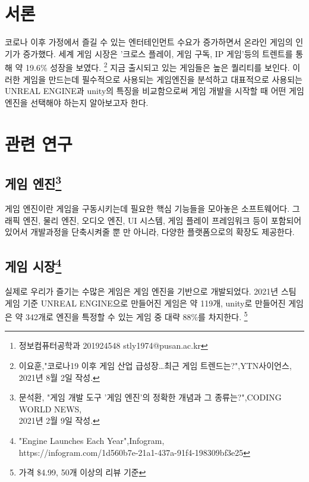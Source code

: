 \documentclass{article}
\title{}
\author{이풍헌\footnote{정보컴퓨터공학과 201924548 stly1974@pusan.ac.kr}}
\date{2022.10.07}
\begin{document}
\maketitle

\section{서론}
코로나 이후 가정에서 즐길 수 있는 엔터테인먼트 수요가 증가하면서 온라인 게임의 인기가 증가했다. 세계 게임 시장은 '크로스 플레이, 게임 구독, IP 게임'등의 트렌트를 통해 약 19.6\% 성장을 보였다.
\footnote{이요훈,"코로나19 이후 게임 산업 급성장…최근 게임 트렌드는?",YTN사이언스,\\2021년 8월 2일 작성.}
지금 출시되고 있는 게임들은 높은 퀄리티를 보인다. 이러한 게임을 만드는데 필수적으로 사용되는 게임엔진을 분석하고 대표적으로 사용되는 UNREAL ENGINE과 unity의 특징을 비교함으로써 게임 개발을 시작할 때 어떤 게임 엔진을 선택해야 하는지 알아보고자 한다.

\section{관련 연구}
\subsection{게임 엔진\protect\footnote{문석환, "게임 개발 도구 '게임 엔진'의 정확한 개념과 그 종류는?",CODING WORLD NEWS,\\2021년 2월 9일 작성.}}
게임 엔진이란 게임을 구동시키는데 필요한 핵심 기능들을 모아놓은 소프트웨어다. 그래픽 엔진, 물리 엔진, 오디오 엔진, UI 시스템, 게임 플레이 프레임워크 등이 포함되어 있어서 개발과정을 단축시켜줄 뿐 만 아니라, 다양한 플랫폼으로의 확장도 제공한다. 


\subsection{게임 시장\protect\footnote{"Engine Launches Each Year",Infogram,\\https://infogram.com/1d560b7e-21a1-437a-91f4-198309bf3e25}}
실제로 우리가 즐기는 수많은 게임은 게임 엔진을 기반으로 개발되었다. 2021년 스팀 게임 기준 UNREAL ENGINE으로 만들어진 게임은 약 119개, unity로 만들어진 게임은 약 342개로 엔진을 특정할 수 있는 게임 중 대략 88\%를 차지한다.
\footnote{가격 \$4.99, 50개 이상의  리뷰 기준}
\end{document}
